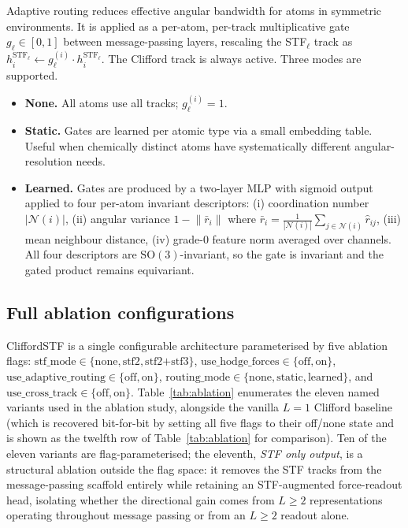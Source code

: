 Adaptive routing reduces effective angular bandwidth for atoms in symmetric environments. It is applied as a per-atom, per-track multiplicative gate $g_\ell \in [0, 1]$ between message-passing layers, rescaling the STF$_\ell$ track as $h^{\mathrm{STF}_\ell}_i \leftarrow g_\ell^{(i)} \cdot h^{\mathrm{STF}_\ell}_i$. The Clifford track is always active. Three modes are supported.
\begin{itemize}
    \item \textbf{None.} All atoms use all tracks; $g_\ell^{(i)} = 1$.
    \item \textbf{Static.} Gates are learned per atomic type via a small embedding table. Useful when chemically distinct atoms have systematically different angular-resolution needs.
    \item \textbf{Learned.} Gates are produced by a two-layer MLP with sigmoid output applied to four per-atom invariant descriptors: (i) coordination number $|\mathcal{N}(i)|$, (ii) angular variance $1 - \lVert\bar{r}_i\rVert$ where $\bar{r}_i = \tfrac{1}{|\mathcal{N}(i)|}\sum_{j\in\mathcal{N}(i)}\hat{r}_{ij}$, (iii) mean neighbour distance, (iv) grade-0 feature norm averaged over channels. All four descriptors are $\mathrm{SO}(3)$-invariant, so the gate is invariant and the gated product remains equivariant.
\end{itemize}

\subsection{Full ablation configurations}\label{supp:variants}

CliffordSTF is a single configurable architecture parameterised by five ablation flags: $\mathrm{stf\_mode} \in \{\text{none}, \text{stf2}, \text{stf2+stf3}\}$, $\mathrm{use\_hodge\_forces} \in \{\text{off}, \text{on}\}$, $\mathrm{use\_adaptive\_routing} \in \{\text{off}, \text{on}\}$, $\mathrm{routing\_mode} \in \{\text{none}, \text{static}, \text{learned}\}$, and $\mathrm{use\_cross\_track} \in \{\text{off}, \text{on}\}$. Table~\ref{tab:ablation} enumerates the eleven named variants used in the ablation study, alongside the vanilla $L{=}1$ Clifford baseline (which is recovered bit-for-bit by setting all five flags to their off/none state and is shown as the twelfth row of Table~\ref{tab:ablation} for comparison). Ten of the eleven variants are flag-parameterised; the eleventh, \emph{STF only output}, is a structural ablation outside the flag space: it removes the STF tracks from the message-passing scaffold entirely while retaining an STF-augmented force-readout head, isolating whether the directional gain comes from $L\!\geq\!2$ representations operating throughout message passing or from an $L\!\geq\!2$ readout alone.

